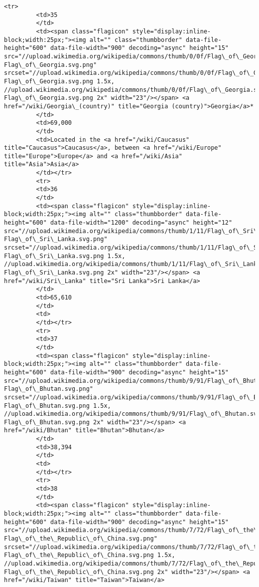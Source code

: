 \documentclass[11pt]{article}
\begin{document}
\begin{Verbatim}[commandchars=\\\{\}]
         <tr>
         <td>35
         </td>
         <td><span class="flagicon" style="display:inline-block;width:25px;"><img alt="" class="thumbborder" data-file-height="600" data-file-width="900" decoding="async" height="15" src="//upload.wikimedia.org/wikipedia/commons/thumb/0/0f/Flag\_of\_Georgia.svg/23px-Flag\_of\_Georgia.svg.png" srcset="//upload.wikimedia.org/wikipedia/commons/thumb/0/0f/Flag\_of\_Georgia.svg/35px-Flag\_of\_Georgia.svg.png 1.5x, //upload.wikimedia.org/wikipedia/commons/thumb/0/0f/Flag\_of\_Georgia.svg/45px-Flag\_of\_Georgia.svg.png 2x" width="23"/></span> <a href="/wiki/Georgia\_(country)" title="Georgia (country)">Georgia</a>*
         </td>
         <td>69,000
         </td>
         <td>Located in the <a href="/wiki/Caucasus" title="Caucasus">Caucasus</a>, between <a href="/wiki/Europe" title="Europe">Europe</a> and <a href="/wiki/Asia" title="Asia">Asia</a>
         </td></tr>
         <tr>
         <td>36
         </td>
         <td><span class="flagicon" style="display:inline-block;width:25px;"><img alt="" class="thumbborder" data-file-height="600" data-file-width="1200" decoding="async" height="12" src="//upload.wikimedia.org/wikipedia/commons/thumb/1/11/Flag\_of\_Sri\_Lanka.svg/23px-Flag\_of\_Sri\_Lanka.svg.png" srcset="//upload.wikimedia.org/wikipedia/commons/thumb/1/11/Flag\_of\_Sri\_Lanka.svg/35px-Flag\_of\_Sri\_Lanka.svg.png 1.5x, //upload.wikimedia.org/wikipedia/commons/thumb/1/11/Flag\_of\_Sri\_Lanka.svg/46px-Flag\_of\_Sri\_Lanka.svg.png 2x" width="23"/></span> <a href="/wiki/Sri\_Lanka" title="Sri Lanka">Sri Lanka</a>
         </td>
         <td>65,610
         </td>
         <td>
         </td></tr>
         <tr>
         <td>37
         </td>
         <td><span class="flagicon" style="display:inline-block;width:25px;"><img alt="" class="thumbborder" data-file-height="600" data-file-width="900" decoding="async" height="15" src="//upload.wikimedia.org/wikipedia/commons/thumb/9/91/Flag\_of\_Bhutan.svg/23px-Flag\_of\_Bhutan.svg.png" srcset="//upload.wikimedia.org/wikipedia/commons/thumb/9/91/Flag\_of\_Bhutan.svg/35px-Flag\_of\_Bhutan.svg.png 1.5x, //upload.wikimedia.org/wikipedia/commons/thumb/9/91/Flag\_of\_Bhutan.svg/45px-Flag\_of\_Bhutan.svg.png 2x" width="23"/></span> <a href="/wiki/Bhutan" title="Bhutan">Bhutan</a>
         </td>
         <td>38,394
         </td>
         <td>
         </td></tr>
         <tr>
         <td>38
         </td>
         <td><span class="flagicon" style="display:inline-block;width:25px;"><img alt="" class="thumbborder" data-file-height="600" data-file-width="900" decoding="async" height="15" src="//upload.wikimedia.org/wikipedia/commons/thumb/7/72/Flag\_of\_the\_Republic\_of\_China.svg/23px-Flag\_of\_the\_Republic\_of\_China.svg.png" srcset="//upload.wikimedia.org/wikipedia/commons/thumb/7/72/Flag\_of\_the\_Republic\_of\_China.svg/35px-Flag\_of\_the\_Republic\_of\_China.svg.png 1.5x, //upload.wikimedia.org/wikipedia/commons/thumb/7/72/Flag\_of\_the\_Republic\_of\_China.svg/45px-Flag\_of\_the\_Republic\_of\_China.svg.png 2x" width="23"/></span> <a href="/wiki/Taiwan" title="Taiwan">Taiwan</a>

\end{Verbatim}
\end{document}
